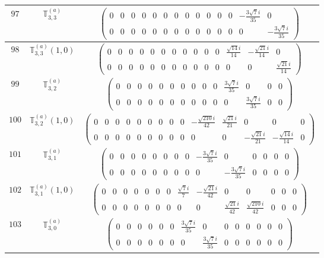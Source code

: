 \documentclass[fleqn,8pt,landscape]{jsarticle}
\begin{document}
\begin{center}
\begin{longtable}{ccc}
$ 97 $ & $ \mathbb{T}_{3,3}^{(a)} $ & $ \begin{pmatrix} 0 & 0 & 0 & 0 & 0 & 0 & 0 & 0 & 0 & 0 & 0 & 0 & - \frac{3 \sqrt{7} i}{35} & 0 \\ 0 & 0 & 0 & 0 & 0 & 0 & 0 & 0 & 0 & 0 & 0 & 0 & 0 & - \frac{3 \sqrt{7} i}{35} \end{pmatrix} $ \\ \hline
$ 98 $ & $ \mathbb{T}_{3,3}^{(a)}(1,0) $ & $ \begin{pmatrix} 0 & 0 & 0 & 0 & 0 & 0 & 0 & 0 & 0 & 0 & 0 & \frac{\sqrt{14} i}{14} & - \frac{\sqrt{21} i}{14} & 0 \\ 0 & 0 & 0 & 0 & 0 & 0 & 0 & 0 & 0 & 0 & 0 & 0 & 0 & \frac{\sqrt{21} i}{14} \end{pmatrix} $ \\ \hline
$ 99 $ & $ \mathbb{T}_{3,2}^{(a)} $ & $ \begin{pmatrix} 0 & 0 & 0 & 0 & 0 & 0 & 0 & 0 & 0 & 0 & \frac{3 \sqrt{7} i}{35} & 0 & 0 & 0 \\ 0 & 0 & 0 & 0 & 0 & 0 & 0 & 0 & 0 & 0 & 0 & \frac{3 \sqrt{7} i}{35} & 0 & 0 \end{pmatrix} $ \\ \hline
$ 100 $ & $ \mathbb{T}_{3,2}^{(a)}(1,0) $ & $ \begin{pmatrix} 0 & 0 & 0 & 0 & 0 & 0 & 0 & 0 & 0 & - \frac{\sqrt{210} i}{42} & \frac{\sqrt{21} i}{21} & 0 & 0 & 0 \\ 0 & 0 & 0 & 0 & 0 & 0 & 0 & 0 & 0 & 0 & 0 & - \frac{\sqrt{21} i}{21} & - \frac{\sqrt{14} i}{14} & 0 \end{pmatrix} $ \\ \hline
$ 101 $ & $ \mathbb{T}_{3,1}^{(a)} $ & $ \begin{pmatrix} 0 & 0 & 0 & 0 & 0 & 0 & 0 & 0 & - \frac{3 \sqrt{7} i}{35} & 0 & 0 & 0 & 0 & 0 \\ 0 & 0 & 0 & 0 & 0 & 0 & 0 & 0 & 0 & - \frac{3 \sqrt{7} i}{35} & 0 & 0 & 0 & 0 \end{pmatrix} $ \\ \hline
$ 102 $ & $ \mathbb{T}_{3,1}^{(a)}(1,0) $ & $ \begin{pmatrix} 0 & 0 & 0 & 0 & 0 & 0 & 0 & \frac{\sqrt{7} i}{7} & - \frac{\sqrt{21} i}{42} & 0 & 0 & 0 & 0 & 0 \\ 0 & 0 & 0 & 0 & 0 & 0 & 0 & 0 & 0 & \frac{\sqrt{21} i}{42} & \frac{\sqrt{210} i}{42} & 0 & 0 & 0 \end{pmatrix} $ \\ \hline
$ 103 $ & $ \mathbb{T}_{3,0}^{(a)} $ & $ \begin{pmatrix} 0 & 0 & 0 & 0 & 0 & 0 & \frac{3 \sqrt{7} i}{35} & 0 & 0 & 0 & 0 & 0 & 0 & 0 \\ 0 & 0 & 0 & 0 & 0 & 0 & 0 & \frac{3 \sqrt{7} i}{35} & 0 & 0 & 0 & 0 & 0 & 0 \end{pmatrix} $ \\ \hline

\end{longtable}
\end{center}
\end{document}
